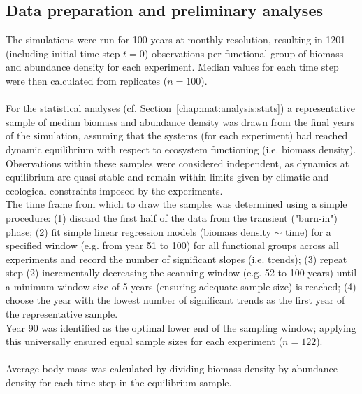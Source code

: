 \subsection{Data preparation and preliminary analyses}
The simulations were run for 100 years at monthly resolution, resulting in 1201 (including initial time step $t = 0$) observations per functional group of biomass and abundance density for each experiment. Median values for each time step were then calculated from replicates ($n = 100$). 
\\\\
For the statistical analyses (cf. Section~\ref{chap:mat:analysis:stats}) a representative sample of median biomass and abundance density was drawn from the final years of the simulation, assuming that the systems (for each experiment) had reached dynamic equilibrium with respect to ecosystem functioning (i.e. biomass density). 
Observations within these samples were considered independent, as dynamics at equilibrium are quasi-stable and remain within limits given by climatic and ecological constraints imposed by the experiments. \\
The time frame from which to draw the samples was determined using a simple procedure: (1) discard the first half of the data from the transient ("burn-in") phase; (2) fit simple linear regression models (biomass density $\sim$ time) for a specified window (e.g. from year 51 to 100) for all functional groups  across all experiments and record the number of significant slopes (i.e. trends); (3) repeat step (2) incrementally decreasing the scanning window (e.g. 52 to 100 years) until a minimum window size of 5 years (ensuring adequate sample size) is reached; (4) choose the year with the lowest number of significant trends as the first year of the representative sample.\\
Year 90 was  identified as the optimal lower end of the sampling window; applying this universally ensured equal sample sizes for each experiment ($n = 122$).\\\\
Average body mass was calculated by dividing  biomass density by abundance density for each time step in the equilibrium sample.

